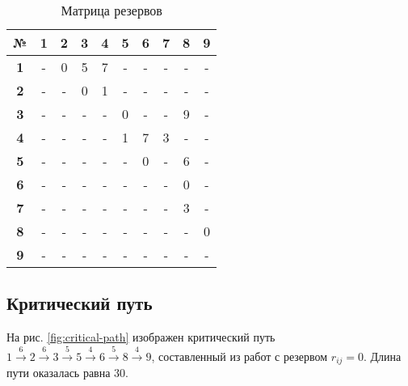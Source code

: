 \begin{table}[H]
	\centering
	\def\tabcolsep{12pt}
	\caption{Матрица резервов}
	\label{tab:reserves}
	\begin{tabular}{|c|c|c|c|c|c|c|c|c|c|}
		\hline
		\bf{№} & \bf{1} & \bf{2} & \bf{3} & \bf{4} & \bf{5} & \bf{6} & \bf{7} & \bf{8} & \bf{9} \\
		\hline
		\bf{1} & - & 0 & 5 & 7 & - & - & - & - & - \\ 
		\hline
		\bf{2} & - & - & 0 & 1 & - & - & - & - & - \\ 
		\hline
		\bf{3} & - & - & - & - & 0 & - & - & 9 & - \\ 
		\hline
		\bf{4} & - & - & - & - & 1 & 7 & 3 & - & - \\ 
		\hline
		\bf{5} & - & - & - & - & - & 0 & - & 6 & - \\ 
		\hline
		\bf{6} & - & - & - & - & - & - & - & 0 & - \\ 
		\hline
		\bf{7} & - & - & - & - & - & - & - & 3 & - \\ 
		\hline
		\bf{8} & - & - & - & - & - & - & - & - & 0 \\ 
		\hline
		\bf{9} & - & - & - & - & - & - & - & - & - \\ 
		\hline
	\end{tabular}
\end{table}

\subsection{Критический путь}

На рис. \ref{fig:critical-path} изображен критический путь $1 \xrightarrow{6} 2 \xrightarrow{6} 3 \xrightarrow{5} 5 \xrightarrow{4} 6 \xrightarrow{5} 8 \xrightarrow{4} 9$, составленный из работ с резервом $r_{ij} = 0$. Длина пути оказалась равна $30$.
 
